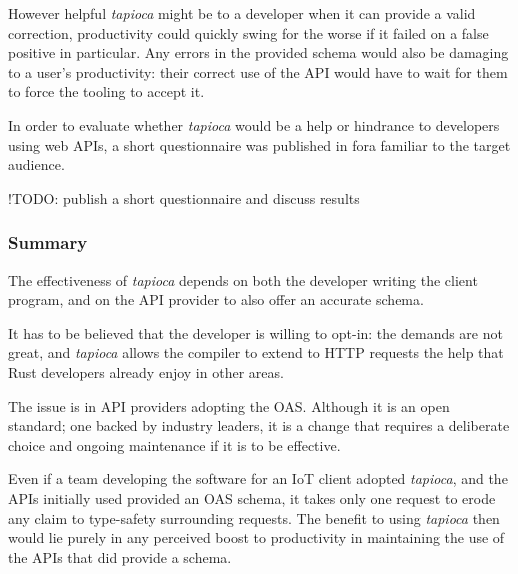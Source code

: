 However helpful \emph{tapioca} might be to a developer when it can provide a valid correction, productivity could quickly swing for the worse if it failed on a false positive in particular. Any errors in the provided schema would also be damaging to a user's productivity: their correct use of the API would have to wait for them to force the tooling to accept it.

In order to evaluate whether \emph{tapioca} would be a help or hindrance to developers using web APIs, a short questionnaire was published in fora familiar to the target audience.

!TODO: publish a short questionnaire and discuss results

\subsubsection{Summary} \label{concl:eval:summary}

The effectiveness of \emph{tapioca} depends on both the developer writing the client program, and on the API provider to also offer an accurate schema.

It has to be believed that the developer is willing to opt-in: the demands are not great, and \emph{tapioca} allows the compiler to extend to HTTP requests the help that Rust developers already enjoy in other areas.

The issue is in API providers adopting the OAS. Although it is an open standard; one backed by industry leaders, it is a change that requires a deliberate choice and ongoing maintenance if it is to be effective.

Even if a team developing the software for an IoT client adopted \emph{tapioca}, and the APIs initially used provided an OAS schema, it takes only one request to erode any claim to type-safety surrounding requests. The benefit to using \emph{tapioca} then would lie purely in any perceived boost to productivity in maintaining the use of the APIs that did provide a schema.